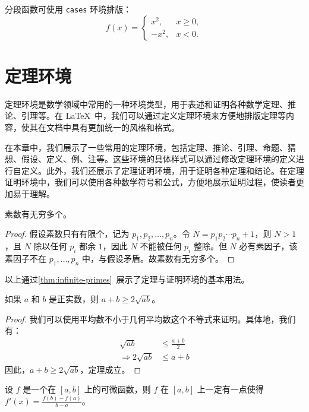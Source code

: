 分段函数可使用 \texttt{cases} 环境排版：
\begin{equation}\label{eq:piecewise}
  f(x) = \begin{cases}
    x^2,   & x \geq 0, \\
    -x^2,  & x < 0.
  \end{cases}
\end{equation}

\section{定理环境}

定理环境是数学领域中常用的一种环境类型，用于表述和证明各种数学定理、推论、引理等。在 \LaTeX\ 中，我们可以通过定义定理环境来方便地排版定理等内容，使其在文档中具有更加统一的风格和格式。

在本章中，我们展示了一些常用的定理环境，包括定理、推论、引理、命题、猜想、假设、定义、例、注等。这些环境的具体样式可以通过修改定理环境的定义进行自定义。此外，我们还展示了定理证明环境，用于证明各种定理和结论。在定理证明环境中，我们可以使用各种数学符号和公式，方便地展示证明过程，使读者更加易于理解。

\begin{thm}\label{thm:infinite-primes}
  素数有无穷多个。
\end{thm}

\begin{proof}
  假设素数只有有限个，记为 $p_1, p_2, \dots, p_n$。令 $N = p_1 p_2 \cdots p_n + 1$，则 $N > 1$，且 $N$ 除以任何 $p_i$ 都余 $1$，因此 $N$ 不能被任何 $p_i$ 整除。但 $N$ 必有素因子，该素因子不在 $p_1, \dots, p_n$ 中，与假设矛盾。故素数有无穷多个。
\end{proof}

以上通过\cref{thm:infinite-primes}~展示了定理与证明环境的基本用法。

\begin{cor}
  如果 $a$ 和 $b$ 是正实数，则 $a+b \geq 2\sqrt{ab}$。
\end{cor}

\begin{proof}
  我们可以使用平均数不小于几何平均数这个不等式来证明。具体地，我们有：
  \begin{align*}
    \sqrt{ab}              & \leq \frac{a+b}{2} \\
    \Rightarrow 2\sqrt{ab} & \leq a+b
  \end{align*}
  因此，$a+b \geq 2\sqrt{ab}$，定理成立。
\end{proof}

\begin{lem}
  设 $f$ 是一个在 $[a,b]$ 上的可微函数，则 $f$ 在 $[a,b]$ 上一定有一点使得 $f'(x) = \frac{f(b)-f(a)}{b-a}$。
\end{lem}

